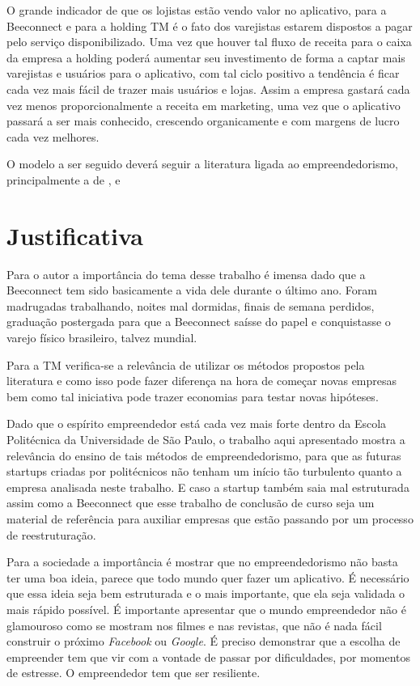 O grande indicador de que os lojistas estão vendo valor no aplicativo, para a Beeconnect e para a holding TM é o fato dos varejistas estarem dispostos a pagar pelo serviço disponibilizado. Uma vez que houver tal fluxo de receita para o caixa da empresa a holding poderá aumentar seu investimento de forma a captar mais varejistas e usuários para o aplicativo, com tal ciclo positivo a tendência é ficar cada vez mais fácil de trazer mais usuários e lojas. Assim a empresa gastará cada vez menos proporcionalmente a receita em marketing, uma vez que o aplicativo passará a ser mais conhecido, crescendo organicamente e com margens de lucro cada vez melhores. 

O modelo a ser seguido deverá seguir a literatura ligada ao empreendedorismo, principalmente a de ,  e 

\section{Justificativa}
\label{cha:justificativa}
Para o autor a importância do tema desse trabalho é imensa dado que a Beeconnect tem sido basicamente a vida dele durante o último ano. Foram madrugadas trabalhando, noites mal dormidas, finais de semana perdidos, graduação postergada para que a Beeconnect saísse do papel e conquistasse o varejo físico brasileiro, talvez mundial.

Para a TM verifica-se a relevância de utilizar os métodos propostos pela literatura e como isso pode fazer diferença na hora de começar novas empresas bem como tal iniciativa pode trazer economias para testar novas hipóteses.

Dado que o espírito empreendedor está cada vez mais forte dentro da Escola Politécnica da Universidade de São Paulo, o trabalho aqui apresentado mostra a relevância do ensino de tais métodos de empreendedorismo, para que as futuras startups criadas por politécnicos não tenham um início tão turbulento quanto a empresa analisada neste trabalho. E caso a startup também saia mal estruturada assim como a Beeconnect que esse trabalho de conclusão de curso seja um material de referência para auxiliar empresas que estão passando por um processo de reestruturação.

Para a sociedade a importância é mostrar que no empreendedorismo não basta ter uma boa ideia, parece que todo mundo quer fazer um aplicativo. É necessário que essa ideia seja bem estruturada e o mais importante, que ela seja validada o mais rápido possível. É importante apresentar que o mundo empreendedor não é glamouroso como se mostram nos filmes e nas revistas, que não é nada fácil construir o próximo \textit{Facebook} ou \textit{Google}. É preciso demonstrar que a escolha de empreender tem que vir com a vontade de passar por dificuldades, por momentos de estresse. O empreendedor tem que ser resiliente. 

